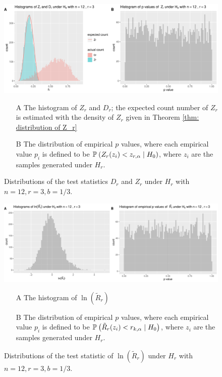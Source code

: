 \documentclass{report}
\begin{document}
    
    \begin{figure}[hbtp]
    \centering
    \includegraphics[scale = 0.6]{plot_3.pdf}
    \caption{Distributions of the test statistics $D_r$ and $Z_r$ under $H_r$ with $n =12, r =3, b = 1/3$.}
    {\label{Figure: test stats dis of exp case}
    \par {\small
        \begin{itemize}
            \item[A] The histogram of $Z_r$ and $D_r$; the expected count number of $Z_r$ is estimated with the density of $Z_r$ given in Theorem \ref{thm: distribution of Z_r} \\
            \item[B] The distribution of empirical $p$ values, where each empirical value $p_i$ is defined to be $\P{Z_r(z_i) < z_{r,\alpha} \mid H_0}$, where $z_i$ are the samples generated under $H_r$.
        \end{itemize}
        }}
\end{figure}

\begin{figure}[hbtp]
    \centering
    \includegraphics[scale = 0.6]{plot_4.pdf}
    \caption{Distributions of the test statistic of $\ln( \tilde R_r)$ under $H_r$ with $n =12, r =3, b = 1/3$.}
    {\label{Figure: test stats dis of exp case}
    \par {\small
    \begin{itemize}
        \item[A] The histogram of $\ln( \tilde R_r)$
        \item[B] The distribution of empirical $p$ values, where each empirical value $p_i$ is defined to be $\P{\tilde R_r(z_i) < r_{k,\alpha} \mid H_0}$, where $z_i$ are the samples generated under $H_r$.
        \end{itemize}
        }}
    \end{figure}
\end{document}
